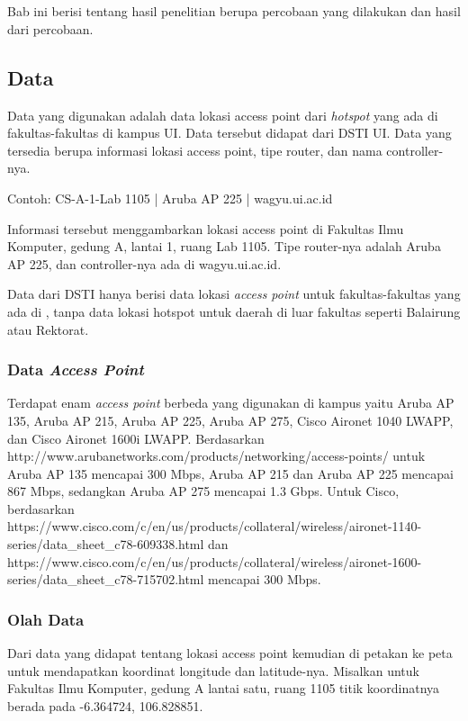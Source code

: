 \chapter{\babEmpat}

Bab ini berisi tentang hasil penelitian berupa percobaan yang dilakukan dan hasil dari percobaan.

\section{Data}
Data yang digunakan adalah data lokasi access point dari \textit{hotspot} yang ada di fakultas-fakultas di kampus UI. Data tersebut didapat dari DSTI UI. Data yang tersedia berupa informasi lokasi access point, tipe router, dan nama controller-nya.

Contoh: CS-A-1-Lab 1105 | Aruba AP 225 | wagyu.ui.ac.id

Informasi tersebut menggambarkan lokasi access point di Fakultas Ilmu Komputer, gedung A, lantai 1, ruang Lab 1105. Tipe router-nya adalah Aruba AP 225, dan controller-nya ada di wagyu.ui.ac.id.

Data dari DSTI hanya berisi data lokasi \textit{access point} untuk fakultas-fakultas yang ada di {\ui}, tanpa data lokasi hotspot untuk daerah di luar fakultas seperti Balairung atau Rektorat.

\subsection{Data \textit{Access Point}}
Terdapat enam \textit{access point} berbeda yang digunakan di kampus {\ui} yaitu Aruba AP 135, Aruba AP 215, Aruba AP 225, Aruba AP 275, Cisco Aironet 1040 LWAPP, dan Cisco Aironet 1600i LWAPP. Berdasarkan http://www.arubanetworks.com/products/networking/access-points/ untuk Aruba AP 135 mencapai 300 Mbps, Aruba AP 215 dan Aruba AP 225 mencapai 867 Mbps, sedangkan Aruba AP 275 mencapai 1.3 Gbps. Untuk Cisco, berdasarkan https://www.cisco.com/c/en/us/products/collateral/wireless/aironet-1140-series/data_sheet_c78-609338.html dan https://www.cisco.com/c/en/us/products/collateral/wireless/aironet-1600-series/data_sheet_c78-715702.html mencapai 300 Mbps.

\subsection{Olah Data}
Dari data yang didapat tentang lokasi access point kemudian di petakan ke peta untuk mendapatkan koordinat longitude dan latitude-nya. Misalkan untuk Fakultas Ilmu Komputer, gedung A lantai satu, ruang 1105 titik koordinatnya berada pada -6.364724, 106.828851.

